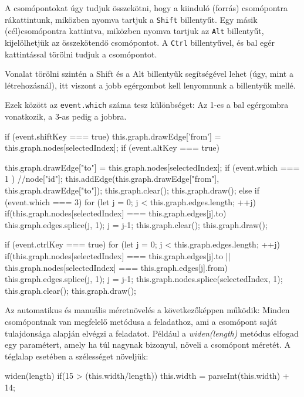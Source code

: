 A csomópontokat úgy tudjuk összekötni, hogy a kiinduló (forrás) csomópontra rákattintunk, miközben nyomva tartjuk a \texttt{Shift} billentyűt. Egy másik (cél)csomópontra kattintva, miközben nyomva tartjuk az \texttt{Alt} billentyűt, kijelölhetjük az összekötendő csomópontot. A \texttt{Ctrl} billentyűvel, és bal egér kattintással törölni tudjuk a csomópontot.

Vonalat törölni szintén a Shift és a Alt billentyűk segítségével lehet (úgy, mint a létrehozásnál), itt viszont a jobb egérgombot kell lenyomnunk a billentyűk mellé.

Ezek között az \texttt{event.which} száma tesz különbséget: Az 1-es a bal egérgombra vonatkozik, a 3-as pedig a jobbra.

\begin{javascript}
if (event.shiftKey === true) {
    this.graph.drawEdge['from'] = this.graph.nodes[selectedIndex];
}
if (event.altKey === true) {
    this.graph.drawEdge["to"] = this.graph.nodes[selectedIndex];
    if (event.which === 1 ){
        //node["id"];
        this.addEdge(this.graph.drawEdge["from"], this.graph.drawEdge["to"]);
        this.graph.clear();
        this.graph.draw();
    } else if (event.which === 3){
        for (let j = 0; j < this.graph.edges.length; ++j) {
            if(this.graph.nodes[selectedIndex] === this.graph.edges[j].to)
            {
                this.graph.edges.splice(j, 1);
                j = j-1;
                this.graph.clear();
                this.graph.draw();
            }
        }
    }

}
if (event.ctrlKey === true) {
    for (let j = 0; j < this.graph.edges.length; ++j) {
        if(this.graph.nodes[selectedIndex] === this.graph.edges[j].to || this.graph.nodes[selectedIndex] === this.graph.edges[j].from)
        {
            this.graph.edges.splice(j, 1);
            j = j-1;
        }
    }
    this.graph.nodes.splice(selectedIndex, 1);
    this.graph.clear();
    this.graph.draw();
}
\end{javascript}

Az automatikus és manuális méretnövelés a következőképpen működik: Minden csomópontnak van megfelelő metódusa a feladathoz, ami a csomópont saját tulajdonsága alapján elvégzi a feladatot. Például a \textit{widen(length)} metódus elfogad egy paramétert, amely ha túl nagynak bizonyul, növeli a csomópont méretét. A téglalap esetében a szélességet növeljük:

\begin{javascript}
widen(length){
   if(15 > (this.width/length))
   {
       this.width = parseInt(this.width) + 14;
   }
}
\end{javascript}

